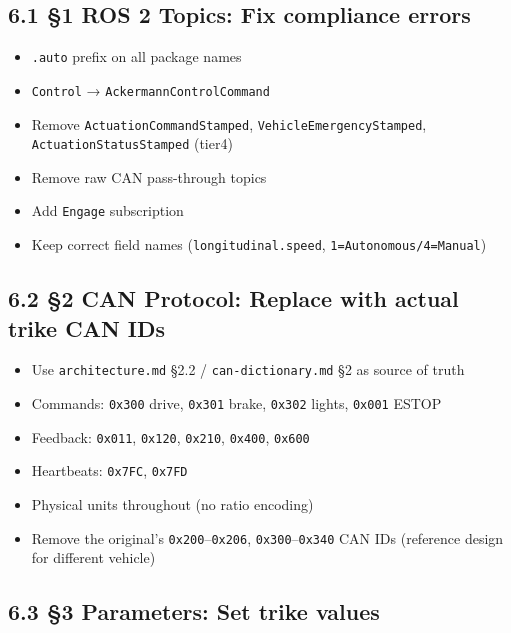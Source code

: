 \documentclass[12pt,a4paper,oneside]{report}
\providecommand{\tightlist}{\setlength{\itemsep}{0pt}\setlength{\parskip}{0pt}}
\begin{document}
\subsection{6.1 §1 ROS 2 Topics: Fix compliance
errors}\label{ros-2-topics-fix-compliance-errors}

\begin{itemize}
\tightlist
\item
  \texttt{.auto} prefix on all package names
\item
  \texttt{Control} → \texttt{AckermannControlCommand}
\item
  Remove \texttt{ActuationCommandStamped}, \texttt{VehicleEmergencyStamped},
  \texttt{ActuationStatusStamped} (tier4)
\item
  Remove raw CAN pass-through topics
\item
  Add \texttt{Engage} subscription
\item
  Keep correct field names (\texttt{longitudinal.speed},
  \texttt{1=Autonomous/4=Manual})
\end{itemize}

\subsection{6.2 §2 CAN Protocol: Replace with actual trike CAN
IDs}\label{can-protocol-replace-with-actual-trike-can-ids}

\begin{itemize}
\tightlist
\item
  Use \texttt{architecture.md} §2.2 / \texttt{can-dictionary.md} §2 as source of
  truth
\item
  Commands: \texttt{0x300} drive, \texttt{0x301} brake, \texttt{0x302} lights,
  \texttt{0x001} ESTOP
\item
  Feedback: \texttt{0x011}, \texttt{0x120}, \texttt{0x210}, \texttt{0x400},
  \texttt{0x600}
\item
  Heartbeats: \texttt{0x7FC}, \texttt{0x7FD}
\item
  Physical units throughout (no ratio encoding)
\item
  Remove the original's \texttt{0x200}--\texttt{0x206},
  \texttt{0x300}--\texttt{0x340} CAN IDs (reference design for different
  vehicle)
\end{itemize}

\subsection{6.3 §3 Parameters: Set trike
values}\label{parameters-set-trike-values}
\end{document}
